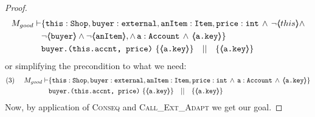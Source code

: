 \begin{proof}
\small
\begin{align*}
M_{good} \vdash & \{  \prg{this}:\prg{Shop}, \prg{buyer} : \prg{external}, 
		\prg{anItem} : \prg{Item}, \prg{price} : \prg{int} \, \wedge\, 
		\neg\inside{this}\wedge \\ 
		&\neg\inside{\prg{buyer}} \wedge \neg\inside{\prg{anItem}}, \wedge\, \prg{a} : \prg{Account}\, \wedge\,  \inside{\prg{a.key}} \}  \\
		 & \prg{buyer.(this.accnt, price)} \ \{ \inside{\prg{a.key}} \} \ \ \  || \ \ \  \{ \inside{\prg{a.key}} \}
\end{align*}
\normalsize
or simplifying the precondition to what we need:
\small
\begin{align*}
\text{(3)} \ \ \ \ M_{good} \vdash & \{  \prg{this}:\prg{Shop}, \prg{buyer} : \prg{external}, \prg{anItem} : \prg{Item}, \prg{price} : \prg{int} \, \wedge\, 
		 \prg{a} : \prg{Account}\, \wedge\,  \inside{\prg{a.key}} \}  \\
		 & \prg{buyer.(this.accnt, price)} \ \{ \inside{\prg{a.key}} \} \ \ \  || \ \ \  \{ \inside{\prg{a.key}} \}
\end{align*}
\normalsize
Now, by application of \textsc{Conseq} and \textsc{Call\_Ext\_Adapt} we get our goal.
%
\end{proof}


